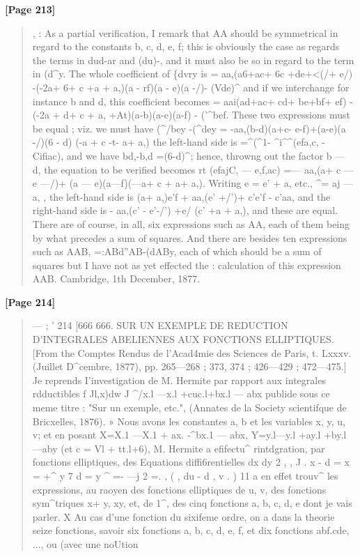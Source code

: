 \documentclass[11pt,a4paper]{book}
\begin{document}
\textbf{[Page 213]}\\[0.2cm]
\begin{quote}
, :
As a partial verification, I remark that AA should be symmetrical in regard to
the constants b, c, d, e, f; this is obviously the case as regards the terms in dud-ar
and (du)-, and it must also be so in regard to the term in (d\textasciicircum{}y. The whole
coefficient of \{dvry is
= aa,(a6+ac+
6c
+de+<(/+
e/)
-(-2a+ 6+ c +a + a,)(a - rf)(a - e)(a -/)- (Vde)\textasciicircum{}
and if we interchange for instance b and d, this coefficient becomes
= aai(ad+ac+ cd+ be+bf+
ef)
-(-2a + d+ c + a, +At)(a-b)(a-e)(a-f) - ('\textasciicircum{}bef.
These two expressions must be equal ; viz. we must have
(\textasciicircum{}/bey -(\textasciicircum{}dey = -aa,(b-d)(a+c- e-f)+(a-e)(a -/)(6 - d) (-a + c -t- a+ a,)
the left-hand side is
=\textasciicircum{}(\textasciicircum{}1-
\textasciicircum{}i\textasciicircum{}\textasciicircum{}(efa,c,
-
Cifiac),
and we have
bd,-b,d =(6-d)\textasciicircum{};
hence, throwng out the factor b --- d, the equation to be verified becomes
rt (efajC, --- e,f,ac) =--- aa,(a+ c --- e ---/)+ (a --- e)(a---f)(---a+ c + a+ a,).
Writing
e = e' + a, etc., \textasciicircum{}= aj --- a, ,
the left-hand side is
(a+
a,)e'f
+
aa,(e'
+/')+
c'e'f
-
c'aa,
and the right-hand side is
- aa,(c' - e'-/') +e/ (c' +a + a,),
and these are equal.
There are of course, in all, six expressions such as AA, each of them being by
what precedes a sum of squares. And there are besides ten expressions such as
AAB, =:ABd''AB-(dABy,
each of which should be a sum of squares but I have not as yet effected the
:
calculation of this expression AAB.
Cambridge, 1th December, 1877.
\end{quote}

\textbf{[Page 214]}\\[0.2cm]
\begin{quote}
---
; '
214 [666
666.
SUR UN EXEMPLE DE REDUCTION D'INTEGRALES ABELIENNES
AUX FONCTIONS ELLIPTIQUES.
[From the Comptes Rendus de l'Acad4mie des Sciences de Paris, t. Lxxxv. (Juillet
D\textasciicircum{}cembre, 1877), pp. 265---268 ; 373, 374 ; 426---429 ; 472---475.]
Je reprends I'investigation de M. Hermite par rapport aux integrales rdductibles
f Jl,x)dw
J \textasciicircum{}/x.l ---x.l +cuc.l+bx.l --- abx
publide sous ce meme titre : "Sur un exemple, etc.", (Annates de la Society scientifque
de Bricxelles, 1876). »
Nous avons les constantes a, b et les variables x, y, u, v; et en posant
X=X.1 ---X.1 + ax. -\textasciicircum{}bx.1 --- abx,
Y=y.l---y.l +ay.l +by.l---aby
(et c = Vl + tt.l+6), M. Hermite a efifectu\textasciicircum{} rintdgration, par fonctions elliptiques, des
Equations diffi6rentielles
dx dy 2 , , J .
x - d = x = +\textasciicircum{} y 7 d = y \textasciicircum{} =- ---j 2 =. , ( , du - d , v . )
11 a en effet trouv\textasciicircum{} les expressions, au raoyen des fonctions elliptiques de u, v, des
fonctions sym\textasciicircum{}triques x+ y, xy, et, de 1\textasciicircum{}, des cinq fonctions a, b, c, d, e dont je vais
parler.
X
Au cas d'une fonction du sixifeme ordre, on a dans la theorie seize fonctions,
savoir six fonctions a, b, c, d, e, f, et dix fonctions abf.cde, ..., ou (avec une noUtion
\end{quote}
\end{document}
